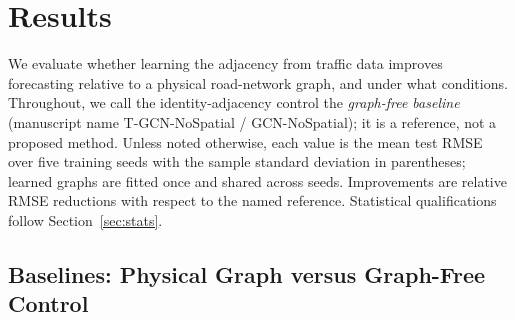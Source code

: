 \section{Results}\label{sec:results}

We evaluate whether learning the adjacency from traffic data improves
forecasting relative to a physical road-network graph, and under what
conditions. Throughout, we call the identity-adjacency control the
\emph{graph-free baseline} (manuscript name T-GCN-NoSpatial / GCN-NoSpatial);
it is a reference, not a proposed method. Unless noted otherwise, each value is the mean test RMSE over
five training seeds with the sample standard deviation in parentheses;
learned graphs are fitted once and shared across seeds. Improvements are
relative RMSE reductions with respect to the named reference. Statistical
qualifications follow Section~\ref{sec:stats}.

\subsection{Baselines: Physical Graph versus Graph-Free Control}\label{sec:res-physical}


